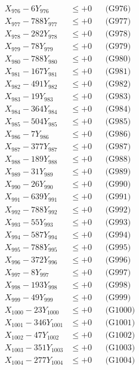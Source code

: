 \documentclass[a4paper,10pt]{article}
\begin{document}
{\begin{align}
X_{976} - 6Y_{976} &\leq +0 && \text{(G976)} \\
X_{977} - 788Y_{977} &\leq +0 && \text{(G977)} \\
X_{978} - 282Y_{978} &\leq +0 && \text{(G978)} \\
X_{979} - 78Y_{979} &\leq +0 && \text{(G979)} \\
X_{980} - 788Y_{980} &\leq +0 && \text{(G980)} \\
\allowbreak
X_{981} - 167Y_{981} &\leq +0 && \text{(G981)} \\
X_{982} - 491Y_{982} &\leq +0 && \text{(G982)} \\
X_{983} - 19Y_{983} &\leq +0 && \text{(G983)} \\
X_{984} - 364Y_{984} &\leq +0 && \text{(G984)} \\
X_{985} - 504Y_{985} &\leq +0 && \text{(G985)} \\
X_{986} - 7Y_{986} &\leq +0 && \text{(G986)} \\
X_{987} - 377Y_{987} &\leq +0 && \text{(G987)} \\
X_{988} - 189Y_{988} &\leq +0 && \text{(G988)} \\
X_{989} - 31Y_{989} &\leq +0 && \text{(G989)} \\
X_{990} - 26Y_{990} &\leq +0 && \text{(G990)} \\
\allowbreak
X_{991} - 639Y_{991} &\leq +0 && \text{(G991)} \\
X_{992} - 788Y_{992} &\leq +0 && \text{(G992)} \\
X_{993} - 55Y_{993} &\leq +0 && \text{(G993)} \\
X_{994} - 587Y_{994} &\leq +0 && \text{(G994)} \\
X_{995} - 788Y_{995} &\leq +0 && \text{(G995)} \\
X_{996} - 372Y_{996} &\leq +0 && \text{(G996)} \\
X_{997} - 8Y_{997} &\leq +0 && \text{(G997)} \\
X_{998} - 193Y_{998} &\leq +0 && \text{(G998)} \\
X_{999} - 49Y_{999} &\leq +0 && \text{(G999)} \\
X_{1000} - 23Y_{1000} &\leq +0 && \text{(G1000)} \\
\allowbreak
X_{1001} - 346Y_{1001} &\leq +0 && \text{(G1001)} \\
X_{1002} - 47Y_{1002} &\leq +0 && \text{(G1002)} \\
X_{1003} - 351Y_{1003} &\leq +0 && \text{(G1003)} \\
X_{1004} - 277Y_{1004} &\leq +0 && \text{(G1004)} \\

\end{align}}
\end{document}
